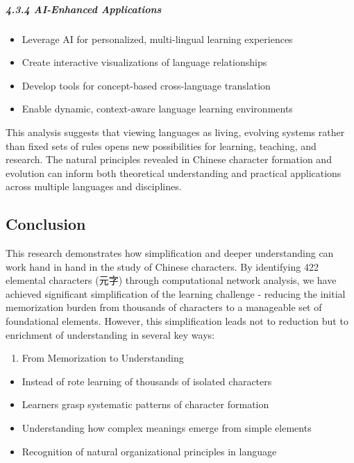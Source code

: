 \subparagraph{4.3.4 AI-Enhanced
Applications}\label{ai-enhanced-applications}

\begin{itemize}
\tightlist
\item
  Leverage AI for personalized, multi-lingual learning experiences
\item
  Create interactive visualizations of language relationships
\item
  Develop tools for concept-based cross-language translation
\item
  Enable dynamic, context-aware language learning environments
\end{itemize}

This analysis suggests that viewing languages as living, evolving
systems rather than fixed sets of rules opens new possibilities for
learning, teaching, and research. The natural principles revealed in
Chinese character formation and evolution can inform both theoretical
understanding and practical applications across multiple languages and
disciplines.

\subsection{Conclusion}\label{conclusion}

This research demonstrates how simplification and deeper understanding
can work hand in hand in the study of Chinese characters. By identifying
422 elemental characters (元字) through computational network analysis,
we have achieved significant simplification of the learning challenge -
reducing the initial memorization burden from thousands of characters to
a manageable set of foundational elements. However, this simplification
leads not to reduction but to enrichment of understanding in several key
ways:

\begin{enumerate}
\def\labelenumi{\arabic{enumi}.}
\tightlist
\item
  From Memorization to Understanding
\end{enumerate}

\begin{itemize}
\tightlist
\item
  Instead of rote learning of thousands of isolated characters
\item
  Learners grasp systematic patterns of character formation
\item
  Understanding how complex meanings emerge from simple elements
\item
  Recognition of natural organizational principles in language
\end{itemize}

